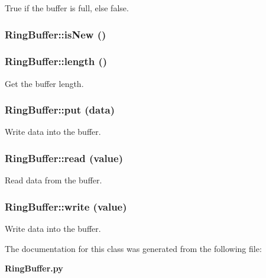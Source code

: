 True if the buffer is full, else false. 

\subsubsection{\setlength{\rightskip}{0pt plus 5cm}Ring\-Buffer::is\-New ()}\label{classRingBuffer_RingBuffera9}


\subsubsection{\setlength{\rightskip}{0pt plus 5cm}Ring\-Buffer::length ()}\label{classRingBuffer_RingBuffera4}


Get the buffer length. 

\subsubsection{\setlength{\rightskip}{0pt plus 5cm}Ring\-Buffer::put (data)}\label{classRingBuffer_RingBuffera10}


Write data into the buffer. 

\subsubsection{\setlength{\rightskip}{0pt plus 5cm}Ring\-Buffer::read (value)}\label{classRingBuffer_RingBuffera6}


Read data from the buffer. 

\subsubsection{\setlength{\rightskip}{0pt plus 5cm}Ring\-Buffer::write (value)}\label{classRingBuffer_RingBuffera5}


Write data into the buffer. 



The documentation for this class was generated from the following file:\begin{CompactItemize}
\item 
{\bf Ring\-Buffer.py}\end{CompactItemize}
